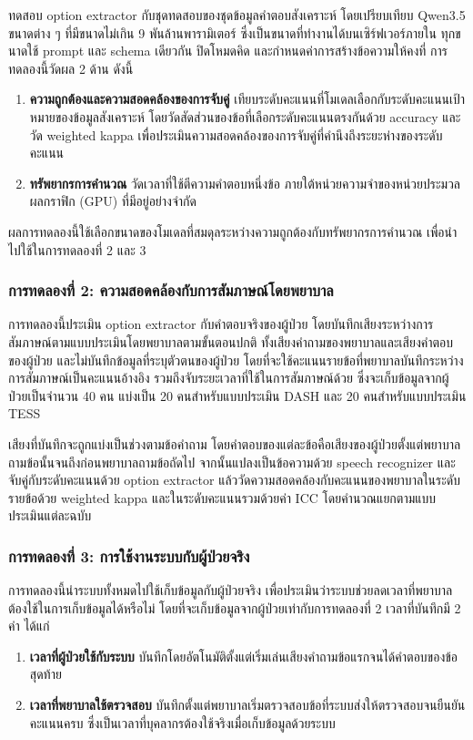 ทดสอบ option extractor กับชุดทดสอบของชุดข้อมูลคำตอบสังเคราะห์ โดยเปรียบเทียบ Qwen3.5 ขนาดต่าง ๆ ที่มีขนาดไม่เกิน 9 พันล้านพารามิเตอร์
ซึ่งเป็นขนาดที่ทำงานได้บนเซิร์ฟเวอร์ภายใน ทุกขนาดใช้ prompt และ schema เดียวกัน ปิดโหมดคิด และกำหนดค่าการสร้างข้อความให้คงที่
การทดลองนี้วัดผล 2 ด้าน ดังนี้
\begin{enumerate}
    \item \textbf{ความถูกต้องและความสอดคล้องของการจับคู่} เทียบระดับคะแนนที่โมเดลเลือกกับระดับคะแนนเป้าหมายของข้อมูลสังเคราะห์
    โดยวัดสัดส่วนของข้อที่เลือกระดับคะแนนตรงกันด้วย accuracy 
    และวัด weighted kappa เพื่อประเมินความสอดคล้องของการจับคู่ที่คำนึงถึงระยะห่างของระดับคะแนน
    \item \textbf{ทรัพยากรการคำนวณ} วัดเวลาที่ใช้ตีความคำตอบหนึ่งข้อ ภายใต้หน่วยความจำของหน่วยประมวลผลกราฟิก (GPU) ที่มีอยู่อย่างจำกัด
\end{enumerate}
ผลการทดลองนี้ใช้เลือกขนาดของโมเดลที่สมดุลระหว่างความถูกต้องกับทรัพยากรการคำนวณ เพื่อนำไปใช้ในการทดลองที่ 2 และ 3

\subsubsection{การทดลองที่ 2: ความสอดคล้องกับการสัมภาษณ์โดยพยาบาล}

การทดลองนี้ประเมิน option extractor กับคำตอบจริงของผู้ป่วย โดยบันทึกเสียงระหว่างการสัมภาษณ์ตามแบบประเมินโดยพยาบาลตามขั้นตอนปกติ
ทั้งเสียงคำถามของพยาบาลและเสียงคำตอบของผู้ป่วย และไม่บันทึกข้อมูลที่ระบุตัวตนของผู้ป่วย
โดยที่จะใช้คะแนนรายข้อที่พยาบาลบันทึกระหว่างการสัมภาษณ์เป็นคะแนนอ้างอิง รวมถึงจับระยะเวลาที่ใช้ในการสัมภาษณ์ด้วย
ซึ่งจะเก็บข้อมูลจากผู้ป่วยเป็นจำนวน 40 คน แบ่งเป็น 20 คนสำหรับแบบประเมิน DASH และ 20 คนสำหรับแบบประเมิน TESS

เสียงที่บันทึกจะถูกแบ่งเป็นช่วงตามข้อคำถาม โดยคำตอบของแต่ละข้อคือเสียงของผู้ป่วยตั้งแต่พยาบาลถามข้อนั้นจนถึงก่อนพยาบาลถามข้อถัดไป
จากนั้นแปลงเป็นข้อความด้วย speech recognizer และจับคู่กับระดับคะแนนด้วย option extractor
แล้ววัดความสอดคล้องกับคะแนนของพยาบาลในระดับรายข้อด้วย weighted kappa
และในระดับคะแนนรวมด้วยค่า ICC โดยคำนวณแยกตามแบบประเมินแต่ละฉบับ

\subsubsection{การทดลองที่ 3: การใช้งานระบบกับผู้ป่วยจริง}

การทดลองนี้นำระบบทั้งหมดไปใช้เก็บข้อมูลกับผู้ป่วยจริง เพื่อประเมินว่าระบบช่วยลดเวลาที่พยาบาลต้องใช้ในการเก็บข้อมูลได้หรือไม่
โดยที่จะเก็บข้อมูลจากผู้ป่วยเท่ากับการทดลองที่ 2
เวลาที่บันทึกมี 2 ค่า ได้แก่
\begin{enumerate}
    \item \textbf{เวลาที่ผู้ป่วยใช้กับระบบ} บันทึกโดยอัตโนมัติตั้งแต่เริ่มเล่นเสียงคำถามข้อแรกจนได้คำตอบของข้อสุดท้าย
    \item \textbf{เวลาที่พยาบาลใช้ตรวจสอบ} บันทึกตั้งแต่พยาบาลเริ่มตรวจสอบข้อที่ระบบส่งให้ตรวจสอบจนยืนยันคะแนนครบ
    ซึ่งเป็นเวลาที่บุคลากรต้องใช้จริงเมื่อเก็บข้อมูลด้วยระบบ
\end{enumerate}